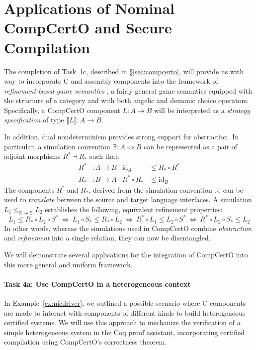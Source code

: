 \section{Applications of Nominal CompCertO and Secure Compilation}
\label{sec:compcertox}

The completion of Task~1c, described in \S\ref{sec:compcerto},
will provide us with way to incorporate C and assembly components
into the framework of \emph{refinement-based game semantics} \cite{rbgs-cal},
a fairly general game semantics
equipped with the structure of a category
and with both angelic and demonic choice operators.
Specifically,
a CompCertO component $L : A \twoheadrightarrow B$
will be interpreted as a \emph{strategy specification} of type
$\llbracket L \rrbracket : A \rightarrow B$.

In addition, dual nondeterminism provides strong support for abstraction.
In particular,
a simulation convention $\mathbb{R} : A \Leftrightarrow B$
can be represented as a pair of adjoint morphisms $R^* \dashv R_*$ such that:
\begin{align*}
  R^* &: A \rightarrow B &
  \mathrm{id}_A &\le R_* \circ R^* \\
  R_* &: B \rightarrow A &
  R^* \circ R_* &\le \mathrm{id}_B
\end{align*}
The components $R^*$ and $R_*$,
derived from the simulation convention $\mathbb{R}$,
can be used
to \emph{translate} between the source and target language interfaces.
A simulation $L_1 \le_{\mathbb{R} \twoheadrightarrow \mathbb{S}} L_2$
establishes the following, equivalent refinement properties:
\[
  L_1 \le R_* \circ L_2 \circ S^* \: \Leftrightarrow \:
  L_1 \circ S_* \le R_* \circ L_2 \: \Leftrightarrow \:
  R^* \circ L_1 \le L_2 \circ S^* \: \Leftrightarrow \:
  R^* \circ L_2 \circ S_* \le L_2
\]
In other words,
whereas the simulations used in CompCertO
combine \emph{abstraction} and \emph{refinement}
into a single relation,
they can now be disentangled.

We will demonstrate several applications for
the integration of CompCertO into this more general and uniform framework.

\vspace*{-2ex}
\paragraph*{Task 4a: Use CompCertO in a heterogeneous context}

In Example~\ref{ex:nicdriver},
we outlined a possible scenario where C components
are made to interact with components of different kinds
to build heterogeneous certified systems.
We will use this approach to
mechanize the verification of a simple heterogeneous system
in the Coq proof assistant,
incorporating certified compilation using CompCertO's correctness theorem.

